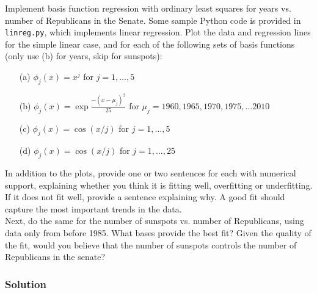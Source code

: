 \documentclass[submit]{harvardml}
\begin{document}
\begin{problem} 

Implement basis function regression with ordinary least squares for
years vs. number of Republicans in the Senate. Some sample Python code
is provided in \verb|linreg.py|, which implements linear regression.
Plot the data and regression lines for the simple linear case, and for
each of the following sets of basis functions (only use (b) for years, skip for sunspots):
\begin{itemize}
	\item[(a)] $\phi_j(x) = x^j$ for $j=1, \ldots, 5$ 
    \item[(b)] $\phi_j(x) = \exp{\frac{-(x-\mu_j)^2}{25}}$ for $\mu_j=1960, 1965, 1970, 1975, \ldots 2010$
	\item[(c)] $\phi_j(x) = \cos(x / j)$ for $j=1, \ldots, 5$
	\item[(d)] $\phi_j(x) = \cos(x / j)$ for $j=1, \ldots, 25$
\end{itemize}
In addition to the plots, provide one or two sentences for each with
numerical support, explaining whether you think it is fitting well,
overfitting or underfitting.  If it does not fit well, provide a
sentence explaining why. A good fit should capture the most important
trends in the data.\\ 

\noindent Next, do the same for the number of sunspots vs. number of
Republicans, using data only from before 1985.  What bases provide the
best fit?  Given the quality of the fit, would you believe that the
number of sunspots controls the number of Republicans in the senate?

\end{problem}



\subsubsection*{Solution}
\end{document}
